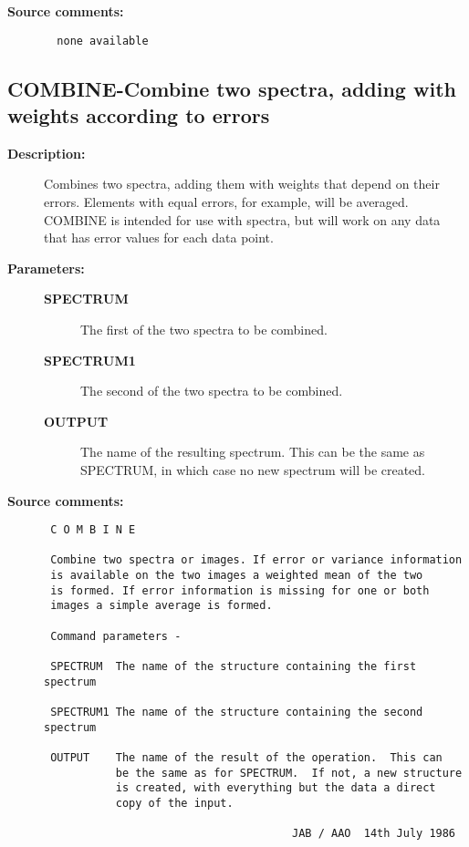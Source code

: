 \begin{description}
\item [{\bf Source comments:}]
\begin{verbatim}
  none available

\end{verbatim}
\end{description}
\subsection{COMBINE-\label{COMBINE}Combine two spectra, adding with weights according to errors}
\begin{description}

\item [{\bf Description:}]
 Combines two spectra, adding them with weights that depend
 on their errors.  Elements with equal errors, for example,
 will be averaged.  COMBINE is intended for use with
 spectra, but will work on any data that has error values for
 each data point.

\item [{\bf Parameters:}]
\begin{description}
\item [{\bf SPECTRUM}]
 The first of the two spectra to be combined.
\item [{\bf SPECTRUM1}]
 The second of the two spectra to be combined.
\item [{\bf OUTPUT}]
 The name of the resulting spectrum.  This can be the
 same as SPECTRUM, in which case no new spectrum will
 be created.
\end{description}

\item [{\bf Source comments:}]
\begin{verbatim}
 C O M B I N E

 Combine two spectra or images. If error or variance information
 is available on the two images a weighted mean of the two
 is formed. If error information is missing for one or both
 images a simple average is formed.

 Command parameters -

 SPECTRUM  The name of the structure containing the first spectrum

 SPECTRUM1 The name of the structure containing the second spectrum

 OUTPUT    The name of the result of the operation.  This can
           be the same as for SPECTRUM.  If not, a new structure
           is created, with everything but the data a direct
           copy of the input.

                                      JAB / AAO  14th July 1986
\end{verbatim}
\end{description}
